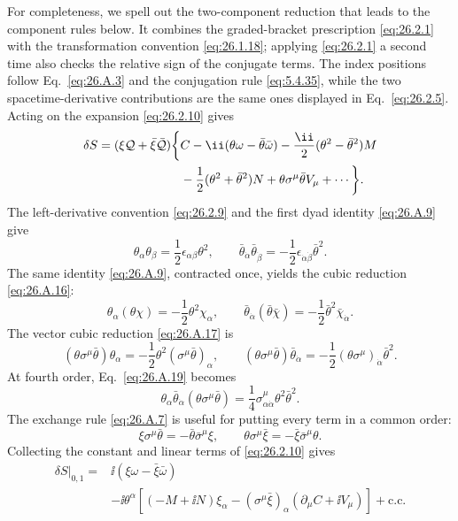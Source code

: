 For completeness, we spell out the two-component reduction that leads to
the component rules below.  It combines the graded-bracket prescription
\eqref{eq:26.2.1} with the transformation convention
\eqref{eq:26.1.18}; applying \eqref{eq:26.2.1} a second time also checks the
relative sign of the conjugate terms.  The index positions follow
Eq.~\eqref{eq:26.A.3} and the conjugation rule
\eqref{eq:5.4.35}, while the two spacetime-derivative contributions are the
same ones displayed in Eq.~\eqref{eq:26.2.5}. Acting on the expansion
\eqref{eq:26.2.10} gives
\[
  \begin{aligned}
  \delta S
  =(\xi\SuperQ+\bar\xi\bar{\SuperQ})
  \biggl\{&
    C-\ii(\theta\omega-\bar\theta\bar\omega)
    -\frac{\ii}{2}(\theta^2-\bar\theta^2)M\\
   &-\frac12(\theta^2+\bar\theta^2)N
    +\theta\sigma^\mu\bar\theta V_\mu+\cdots
  \biggr\}.
  \end{aligned}
\]
The left-derivative convention \eqref{eq:26.2.9} and the first dyad identity
\eqref{eq:26.A.9} give
\[
  \theta_\alpha\theta_\beta
  =\frac12\epsilon_{\alpha\beta}\theta^2,
  \qquad
  \bar\theta_{\dot\alpha}\bar\theta_{\dot\beta}
  =-\frac12\epsilon_{\dot\alpha\dot\beta}\bar\theta^2 .
\]
The same identity \eqref{eq:26.A.9}, contracted once, yields the cubic
reduction \eqref{eq:26.A.16}:
\[
  \theta_\alpha(\theta\chi)
  =-\frac12\theta^2\chi_\alpha,
  \qquad
  \bar\theta_{\dot\alpha}(\bar\theta\bar\chi)
  =-\frac12\bar\theta^2\bar\chi_{\dot\alpha}.
\]
The vector cubic reduction \eqref{eq:26.A.17} is
\[
  (\theta\sigma^\mu\bar\theta)\theta_\alpha
  =-\frac12\theta^2(\sigma^\mu\bar\theta)_\alpha,
  \qquad
  (\theta\sigma^\mu\bar\theta)\bar\theta_{\dot\alpha}
  =-\frac12(\theta\sigma^\mu)_{\dot\alpha}\bar\theta^2 .
\]
At fourth order, Eq.~\eqref{eq:26.A.19} becomes
\[
  \theta_\alpha\bar\theta_{\dot\alpha}
  (\theta\sigma^\mu\bar\theta)
  =\frac14\sigma^\mu_{\alpha\dot\alpha}
    \theta^2\bar\theta^2 .
\]
The exchange rule \eqref{eq:26.A.7} is useful for putting every term in a
common order:
\[
  \xi\sigma^\mu\bar\theta
  =-\bar\theta\bar\sigma^\mu\xi,
  \qquad
  \theta\sigma^\mu\bar\xi
  =-\bar\xi\bar\sigma^\mu\theta .
\]
Collecting the constant and linear terms of \eqref{eq:26.2.10} gives
\[
  \begin{aligned}
  \delta S\big|_{0,1}
  ={}&\ii(\xi\omega-\bar\xi\bar\omega)\\
   &-\ii\theta^\alpha
    \left[(-M+\ii N)\xi_\alpha
      -(\sigma^\mu\bar\xi)_\alpha(\partial_\mu C+\ii V_\mu)\right]
    +\mathrm{c.c.}
  \end{aligned}
\]

